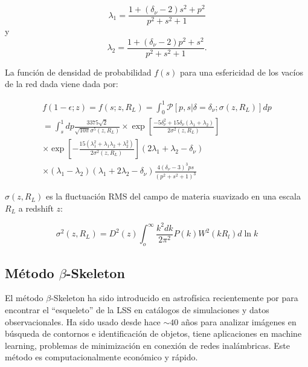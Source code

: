 \documentclass[preprint]{aastex62}
\begin{document}
  \begin{equation}
    \lambda_1 = \frac{1 + (\delta_\nu -2)s^2 + p^2}{p^2 + s^2 + 1}
 \end{equation}
  y  
  \begin{equation}
    \lambda_2 = \frac{1 + (\delta_\nu -2)p^2 + s^2}{p^2 + s^2 + 1}.
  \end{equation}


  La función de densidad de probabilidad $f(s)$ para una esfericidad de los vacíos de la red dada viene dada por:
  
  \begin{eqnarray}
    f(1-\epsilon;z) = f(s;z, R_L) = \int_0^1 \mathcal{P}\left[ p,s|\delta = \delta_\nu;\sigma(z,R_L)\right] dp \nonumber\\
    = \int_s^1 dp \frac{3375 \sqrt{2}}{ \sqrt{10 \pi} \sigma^5(z,R_L)}
     \times \exp \left[ \frac{-5 \delta_\nu^2 + 15 \delta_\nu ( \lambda_1 + \lambda_2 )}{2 \sigma^2(z,R_L)} \right] \nonumber\\
     \times \exp \left[ - \frac{ 15(\lambda_1^2 + \lambda_1 \lambda_2 + \lambda_2^2)}{ 2\sigma^2(z,R_L)}\right]
    (2\lambda_1 + \lambda_2 - \delta_\nu) \nonumber \\
    \times (\lambda_1 - \lambda_2)( \lambda_1 + 2\lambda_2 - \delta_\nu) \frac{ 4 (\delta_\nu - 3)^3 p s }{ ( p^2 + s^2 + 1)^3}
  \end{eqnarray}
  
  $\sigma(z,R_L)$ es la fluctuación RMS del campo de materia suavizado en una escala $R_L$ a
  redshift $z$:
  
  \begin{equation}
    \sigma^2(z,R_L) = D^2(z) \int_o^{\infty} \frac{k^2dk}{2\pi^2}P(k) W^2(kR_l)d \ln k
  \end{equation}



  \subsection{Método $\beta$-Skeleton}


  El método $\beta$-Skeleton ha sido introducido en astrofísica recientemente por \citet{Fang2018} para
  encontrar el ``esqueleto'' de la  LSS en catálogos de simulaciones y datos observacionales.
  Ha sido usado desde hace $\sim 40$ años para analizar imágenes en búsqueda de contornos e identificación
  de objetos, tiene aplicaciones en machine learning, problemas de minimización en conexión de redes
  inalámbricas. Este método es computacionalmente económico y rápido.
  
\end{document}
